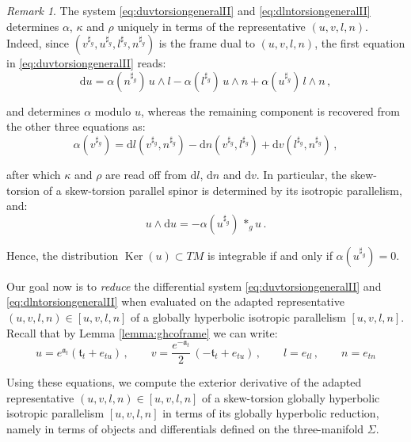 \documentclass[10pt,reqno,a4paper]{amsart}
\theoremstyle{plain}
\theoremstyle{definition}
\theoremstyle{remark}
\newtheorem{remark}[thm]{Remark}
\theoremstyle{remark}
\def\dd{\mathrm{d}}
\def\fra{\mathfrak{a}}
\newcommand{\Ker}{\operatorname{Ker}}
\renewcommand{\(}{ (}
\renewcommand{\)}{ )}
\begin{document}
\begin{remark}
\label{remark:torsiondetermined}
The system \eqref{eq:duvtorsiongeneralII} and \eqref{eq:dlntorsiongeneralII} determines $\alpha$, $\kappa$ and $\rho$ uniquely in terms of the representative $(u,v,l,n)$. Indeed, since $(v^{\sharp_g},u^{\sharp_g},l^{\sharp_g},n^{\sharp_g})$ is the frame dual to $(u,v,l,n)$, the first equation in \eqref{eq:duvtorsiongeneralII} reads:
\begin{equation*}
\dd u = \alpha(n^{\sharp_g})\, u\wedge l - \alpha(l^{\sharp_g})\, u\wedge n + \alpha(u^{\sharp_g})\, l\wedge n\, ,
\end{equation*}

\noindent
and determines $\alpha$ modulo $u$, whereas the remaining component is recovered from the other three equations as:
\begin{equation*}
\alpha(v^{\sharp_g}) = \dd l(v^{\sharp_g},n^{\sharp_g}) - \dd n(v^{\sharp_g},l^{\sharp_g}) + \dd v(l^{\sharp_g},n^{\sharp_g})\, ,
\end{equation*}

\noindent
after which $\kappa$ and $\rho$ are read off from $\dd l$, $\dd n$ and $\dd v$. In particular, the skew-torsion of a skew-torsion parallel spinor is determined by its isotropic parallelism, and:
\begin{equation}
\label{eq:screenrotationinvariant}
u\wedge\dd u = -\alpha(u^{\sharp_g})\, \ast_g u\, .
\end{equation}

\noindent
Hence, the distribution $\Ker(u)\subset TM$ is integrable if and only if $\alpha(u^{\sharp_g})= 0$.
\end{remark}

\noindent
Our goal now is to \emph{reduce} the differential system \eqref{eq:duvtorsiongeneralII} and \eqref{eq:dlntorsiongeneralII} when evaluated on the adapted representative $(u,v,l,n)\in [u,v,l,n]$ of a globally hyperbolic isotropic parallelism $[u,v,l,n]$. Recall that by Lemma \ref{lemma:ghcoframe} we can write:
\begin{equation*}
u = e^{\fra_t} (\mathfrak{t}_t + e_{tu})\, , \qquad v = \frac{e^{-\fra_t}}{2}\,( -  \mathfrak{t}_t + e_{tu})  \, , \qquad l =   e_{tl} \, , \qquad n = e_{tn} 
\end{equation*}

\noindent
Using these equations, we compute the exterior derivative of the adapted representative $(u,v,l,n) \in [u,v,l,n]$ of a skew-torsion globally hyperbolic isotropic parallelism $[u,v,l,n]$ in terms of its globally hyperbolic reduction, namely in terms of objects and differentials defined on the three-manifold $\Sigma$.
\end{document}

